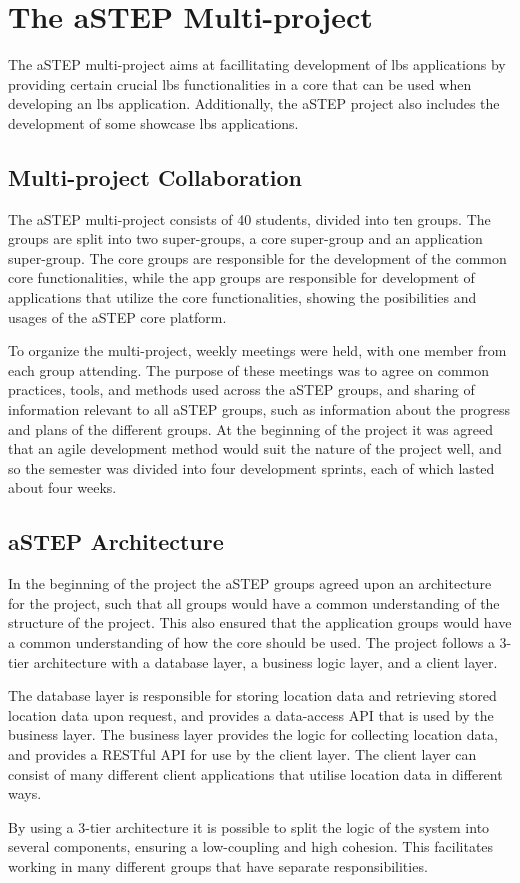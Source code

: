 \section{The aSTEP Multi-project} \label{sec:astep}
The aSTEP multi-project aims at facillitating development of \gls{lbs} applications by providing certain crucial \gls{lbs} functionalities in a core that can be used when developing an \gls{lbs} application. Additionally, the aSTEP project also includes the development of some showcase \gls{lbs} applications.

\subsection{Multi-project Collaboration}
The aSTEP multi-project consists of 40 students, divided into ten groups. The groups are split into two super-groups, a core super-group and an application super-group. The core groups are responsible for the development of the common core functionalities, while the app groups are responsible for development of applications that utilize the core functionalities, showing the posibilities and usages of the aSTEP core platform. 

To organize the multi-project, weekly meetings were held, with one member from each group attending. The purpose of these meetings was to agree on common practices, tools, and methods used across the aSTEP groups, and sharing of information relevant to all aSTEP groups, such as information about the progress and plans of the different groups. At the beginning of the project it was agreed that an agile development method would suit the nature of the project well, and so the semester was divided into four development sprints, each of which lasted about four weeks.

\subsection{aSTEP Architecture}
In the beginning of the project the aSTEP groups agreed upon an architecture for the project, such that all groups would have a common understanding of the structure of the project. This also ensured that the application groups would have a common understanding of how the core should be used. The project follows a 3-tier architecture with a database layer, a business logic layer, and a client layer. 

The database layer is responsible for storing location data and retrieving stored location data upon request, and provides a data-access API that is used by the business layer. The business layer provides the logic for collecting location data, and provides a RESTful API for use by the client layer. The client layer can consist of many different client applications that utilise location data in different ways.

By using a 3-tier architecture it is possible to split the logic of the system into several components, ensuring a low-coupling and high cohesion. This facilitates working in many different groups that have separate responsibilities.